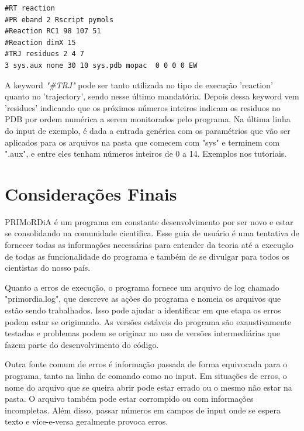 \documentclass[a4paper,11pt]{refart}
\begin{document}
\hspace*{-\leftmarginwidth}
\begin{minipage}{\fullwidth}
\begin{lstlisting}[caption=Exemplo de input para análise de coordenadas de reação.,label={ls.pri3}]
#RT reaction 
#PR eband 2 Rscript pymols
#Reaction RC1 98 107 51
#Reaction dimX 15
#TRJ residues 2 4 7
3 sys.aux none 30 10 sys.pdb mopac  0 0 0 0 EW
\end{lstlisting}
\end{minipage}

A keyword \emph{"\#TRJ"} pode ser tanto utilizada no tipo de execução 'reaction' quanto no 'trajectory', sendo nesse último mandatória. Depois dessa keyword vem 'residues' indicando que os próximos números inteiros indicam os residuos no PDB por ordem numérica a serem monitorados pelo programa. Na última linha do input de exemplo, é dada a entrada genérica com os paramétrios que vão ser aplicados para os arquivos na pasta que comecem com "sys" e terminem com ".aux", e entre eles tenham números inteiros de 0 a 14. Exemplos nos tutoriais. 

\section{Considerações Finais}

PRIMoRDiA é um programa em constante desenvolvimento por ser novo e estar se consolidando na comunidade cientifica. Esse guia de usuário é uma tentativa de fornecer todas as informações necessárias para entender da teoria até a execução de todas as funcionalidade do programa e também de se divulgar para todos os cientistas do nosso país. 

Quanto a erros de execução, o programa fornece um arquivo de log chamado "primordia.log", que descreve as ações do programa e nomeia os arquivos que estão sendo trabalhados. Isso pode ajudar a identificar em que etapa os erros podem estar se originando. As versões estáveis do programa são exaustivamente testadas e problemas podem se originar no uso de versões intermediárias que fazem parte do desenvolvimento do código.  

Outra fonte comum de erros é informação passada de forma equivocada para o programa, tanto na linha de comando como no input. Em situações de erros, o nome do arquivo que se queira abrir pode estar errado ou o mesmo não estar na pasta. O arquivo também pode estar corrompido ou com informações incompletas. Além disso, passar números em campos de input onde se espera texto e vice-e-versa geralmente provoca erros. 
\end{document}
